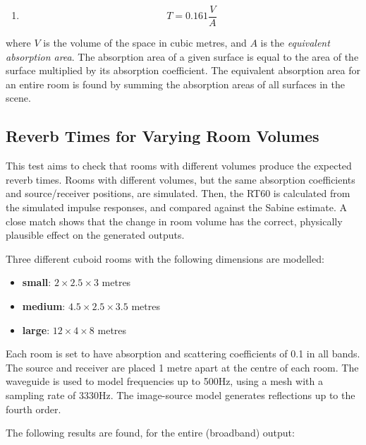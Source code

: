 \documentclass[]{scrreprt}
\providecommand{\tightlist}{%
  \setlength{\itemsep}{0pt}\setlength{\parskip}{0pt}}
\begin{document}
\begin{enumerate}
\def\labelenumi{(\arabic{enumi})}
\setcounter{enumi}{48}
\tightlist
\item
  \[T=0.161\frac{V}{A}\]
\end{enumerate}

where \(V\) is the volume of the space in cubic metres, and \(A\) is the
\emph{equivalent absorption area}. The absorption area of a given
surface is equal to the area of the surface multiplied by its absorption
coefficient. The equivalent absorption area for an entire room is found
by summing the absorption areas of all surfaces in the scene.

\subsection{Reverb Times for Varying Room
Volumes}\label{reverb-times-for-varying-room-volumes}

This test aims to check that rooms with different volumes produce the
expected reverb times. Rooms with different volumes, but the same
absorption coefficients and source/receiver positions, are simulated.
Then, the RT60 is calculated from the simulated impulse responses, and
compared against the Sabine estimate. A close match shows that the
change in room volume has the correct, physically plausible effect on
the generated outputs.

Three different cuboid rooms with the following dimensions are modelled:

\begin{itemize}
\tightlist
\item
  \textbf{small}: \(2 \times 2.5 \times 3\) metres
\item
  \textbf{medium}: \(4.5 \times 2.5 \times 3.5\) metres
\item
  \textbf{large}: \(12 \times 4 \times 8\) metres
\end{itemize}

Each room is set to have absorption and scattering coefficients of 0.1
in all bands. The source and receiver are placed 1 metre apart at the
centre of each room. The waveguide is used to model frequencies up to
500Hz, using a mesh with a sampling rate of 3330Hz. The image-source
model generates reflections up to the fourth order.

The following results are found, for the entire (broadband) output:
\end{document}
